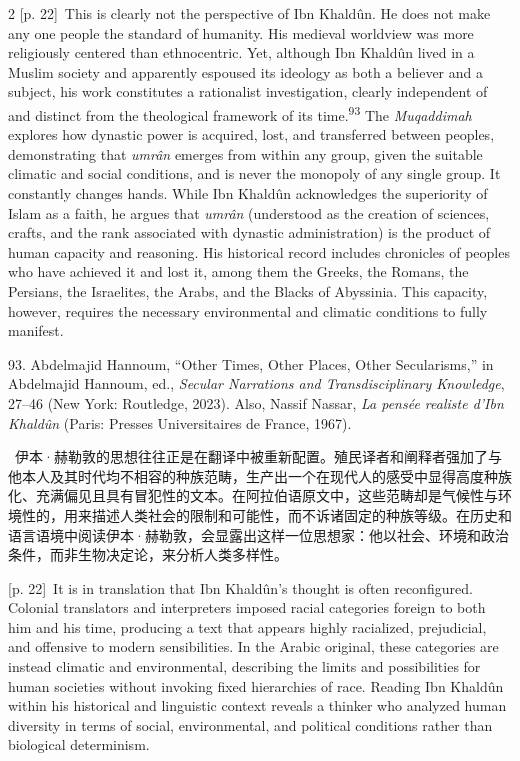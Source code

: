 \documentclass[10pt,a4paper]{article}
\begin{document}
\begin{paracol}{2}
\switchcolumn
{\scriptsize\color{gray} [p. 22]}\ This is clearly not the perspective of Ibn Khaldûn. He does not make any one people the standard of humanity. His medieval worldview was more religiously centered than ethnocentric. Yet, although Ibn Khaldûn lived in a Muslim society and apparently espoused its ideology as both a believer and a subject, his work constitutes a rationalist investigation, clearly independent of and distinct from the theological framework of its time.\nobreak\textsuperscript{93} The \textit{Muqaddimah} explores how dynastic power is acquired, lost, and transferred between peoples, demonstrating that \textit{umrân} emerges from within any group, given the suitable climatic and social conditions, and is never the monopoly of any single group. It constantly changes hands. While Ibn Khaldûn acknowledges the superiority of Islam as a faith, he argues that \textit{umrân} (understood as the creation of sciences, crafts, and the rank associated with dynastic administration) is the product of human capacity and reasoning. His historical record includes chronicles of peoples who have achieved it and lost it, among them the Greeks, the Romans, the Persians, the Israelites, the Arabs, and the Blacks of Abyssinia. This capacity, however, requires the necessary environmental and climatic conditions to fully manifest.\par{\small 93. Abdelmajid Hannoum, “Other Times, Other Places, Other Secularisms,” in Abdelmajid Hannoum, ed., \textit{Secular Narrations and Transdisciplinary Knowledge}, 27–46 (New York: Routledge, 2023). Also, Nassif Nassar, \textit{La pensée realiste d’Ibn Khaldûn} (Paris: Presses Universitaires de France, 1967).\par}
\switchcolumn*
{\scriptsize\color{gray} [p. 22]}\ 伊本·赫勒敦的思想往往正是在翻译中被重新配置。殖民译者和阐释者强加了与他本人及其时代均不相容的种族范畴，生产出一个在现代人的感受中显得高度种族化、充满偏见且具有冒犯性的文本。在阿拉伯语原文中，这些范畴却是气候性与环境性的，用来描述人类社会的限制和可能性，而不诉诸固定的种族等级。在历史和语言语境中阅读伊本·赫勒敦，会显露出这样一位思想家：他以社会、环境和政治条件，而非生物决定论，来分析人类多样性。\par
\switchcolumn
{\scriptsize\color{gray} [p. 22]}\ It is in translation that Ibn Khaldûn’s thought is often reconfigured. Colonial translators and interpreters imposed racial categories foreign to both him and his time, producing a text that appears highly racialized, prejudicial, and offensive to modern sensibilities. In the Arabic original, these categories are instead climatic and environmental, describing the limits and possibilities for human societies without invoking fixed hierarchies of race. Reading Ibn Khaldûn within his historical and linguistic context reveals a thinker who analyzed human diversity in terms of social, environmental, and political conditions rather than biological determinism.\par

\end{paracol}
\end{document}
